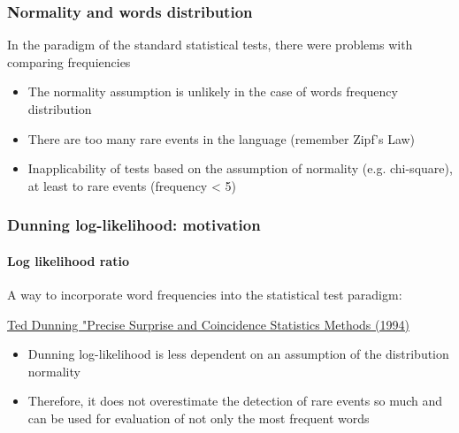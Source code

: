 \documentclass[svgnames]{beamer}
\begin{document}
\begin{frame}
  \frametitle{Normality and words distribution}

In the paradigm of the standard statistical tests, there were problems with comparing frequiencies

  \begin{itemize}
  \item The normality assumption is unlikely in the case of words frequency distribution
  \item There are too many rare events in the language (remember Zipf's Law)
  \item Inapplicability of tests based on the assumption of normality (e.g. chi-square), at least to rare events (frequency < 5)
  \end{itemize}
\end{frame}


\begin{frame}
  \frametitle{Dunning log-likelihood: motivation}
  \framesubtitle{Log likelihood ratio}

A way to incorporate word frequencies into the statistical test paradigm:

  \href{https://aclanthology.org/J93-1003.pdf}{Ted Dunning "Precise
    Surprise and Coincidence Statistics Methods (1994)}
  \begin{itemize}
  \item Dunning log-likelihood is less dependent on an assumption of the distribution normality
  \item Therefore, it does not overestimate the detection of rare events so much and
    can be used for evaluation of not only the most frequent words
  \end{itemize}
\end{frame}
\end{document}
